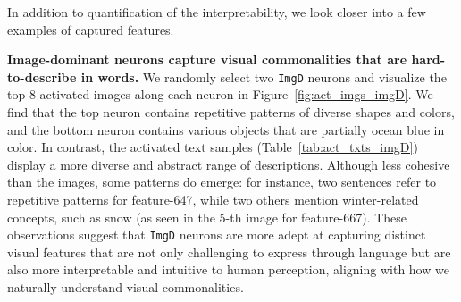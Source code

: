 In addition to quantification of the interpretability, we look closer into a few examples of captured features. 

\textbf{Image-dominant neurons capture visual commonalities that are hard-to-describe in words.} We randomly select two \texttt{ImgD} neurons and visualize the top 8 activated images along each neuron in Figure~\ref{fig:act_imgs_imgD}. We find that the top neuron contains repetitive patterns of diverse shapes and colors, and the bottom neuron contains various objects that are partially ocean blue in color.  In contrast, the activated text samples (Table~\ref{tab:act_txts_imgD}) display a more diverse and abstract range of descriptions. Although less cohesive than the images, some patterns do emerge: for instance, two sentences refer to repetitive patterns for feature-647, while two others mention winter-related concepts, such as snow (as seen in the 5-th image for feature-667). These observations suggest that \texttt{ImgD} neurons are more adept at capturing distinct visual features that are not only challenging to express through language but are also more interpretable and intuitive to human perception, aligning with how we naturally understand visual commonalities.


